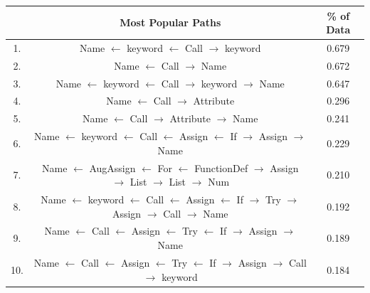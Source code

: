 \begin{table}[p]

    \begin{tabular}{c | c | c}       
    
           & Most Popular Paths  &  \% of Data \\  
        \hline
                
        1.  & Name $\leftarrow$ keyword $\leftarrow$ Call $\rightarrow$ keyword &  0.679 \\ 
        2.  & Name $\leftarrow$ Call $\rightarrow$ Name &  0.672 \\ 
        3.  & Name $\leftarrow$ keyword $\leftarrow$ Call $\rightarrow$ keyword $\rightarrow$ Name &  0.647 \\ 
        4.  & Name $\leftarrow$ Call $\rightarrow$ Attribute &  0.296 \\ 
        5.  & Name $\leftarrow$ Call $\rightarrow$ Attribute $\rightarrow$ Name &  0.241 \\ 
        6.  & Name $\leftarrow$ keyword $\leftarrow$ Call $\leftarrow$ Assign $\leftarrow$ If $\rightarrow$ Assign $\rightarrow$ Name &  0.229 \\ 
        7.  & Name $\leftarrow$ AugAssign $\leftarrow$ For $\leftarrow$ FunctionDef $\rightarrow$ Assign $\rightarrow$ List $\rightarrow$ List $\rightarrow$ Num &  0.210 \\ 
        8.  & Name $\leftarrow$ keyword $\leftarrow$ Call $\leftarrow$ Assign $\leftarrow$ If $\rightarrow$ Try $\rightarrow$ Assign $\rightarrow$ Call $\rightarrow$ Name &  0.192 \\ 
        9.  & Name $\leftarrow$ Call $\leftarrow$ Assign $\leftarrow$ Try $\leftarrow$ If $\rightarrow$ Assign $\rightarrow$ Name &  0.189 \\ 
        10.  & Name $\leftarrow$ Call $\leftarrow$ Assign $\leftarrow$ Try $\leftarrow$ If $\rightarrow$ Assign $\rightarrow$ Call $\rightarrow$ keyword &  0.184 \\ 
  

\end{tabular}
\end{table}
